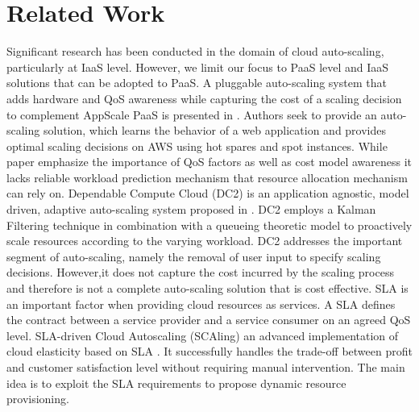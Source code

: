 \section{Related Work}
Significant research has been conducted in the domain of cloud auto-scaling, particularly at IaaS level. However, we limit our focus to PaaS level and IaaS solutions that can be adopted to PaaS. A pluggable auto-scaling system that adds hardware and QoS awareness while capturing the cost of a scaling decision to complement AppScale PaaS is presented in \cite{pluggable}. Authors seek to provide an auto-scaling solution, which learns the behavior of a web application and provides optimal scaling decisions on AWS using hot spares and spot instances.
While paper emphasize the importance of QoS factors as well as cost model awareness it lacks reliable workload prediction mechanism that resource allocation mechanism can rely on. Dependable Compute Cloud (DC2) is an application agnostic, model driven, adaptive auto-scaling system proposed in \cite{modeldriven}. DC2 employs a Kalman Filtering technique in combination with a queueing theoretic model to proactively scale resources according to the varying workload. DC2 addresses the important segment of auto-scaling, namely the removal of user input to specify scaling decisions. However,it does not capture the cost incurred by the scaling process and therefore is not a complete auto-scaling solution that is cost effective. SLA is an important factor when providing cloud resources as services. A SLA defines the contract between a service provider and a service consumer on an agreed QoS level. SLA-driven Cloud Autoscaling (SCAling) an advanced implementation of cloud elasticity based on SLA \cite{sladriven}. It successfully handles the trade-off between profit and customer satisfaction level without requiring manual intervention. The main idea is to exploit the SLA requirements to propose dynamic resource provisioning.


